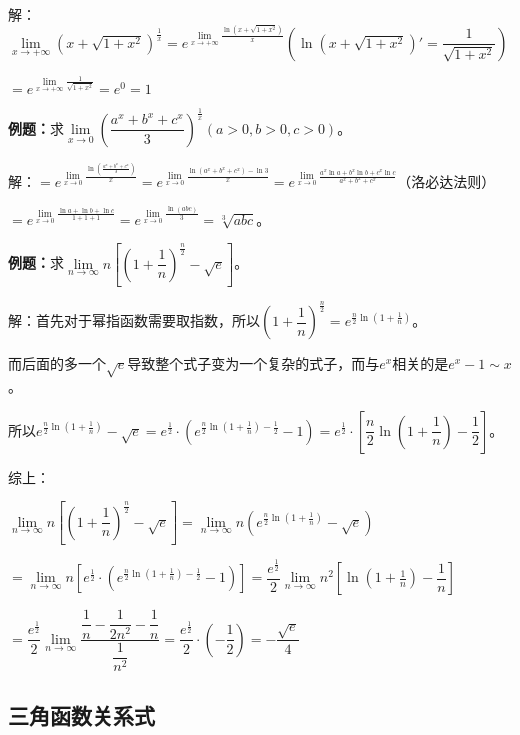 解：$\lim\limits_{x\to+\infty}(x+\sqrt{1+x^2})^{\frac{1}{x}}=e^{\lim\limits_{x\to+\infty}\frac{\ln(x+\sqrt{1+x^2})}{x}} \left(\ln(x+\sqrt{1+x^2})'=\dfrac{1}{\sqrt{1+x^2}}\right)$\medskip

$=e^{\lim\limits_{x\to+\infty}\frac{1}{\sqrt{1+x^2}}}=e^0=1$

\textbf{例题：}求$\lim\limits_{x\to 0}\left(\dfrac{a^x+b^x+c^x}{3}\right)^{\frac{1}{x}}(a>0,b>0,c>0)$。\medskip

解：$=e^{\lim\limits_{x\to 0}\frac{\ln\left(\frac{a^x+b^x+c^x}{3}\right)}{x}}=e^{\lim\limits_{x\to 0}\frac{\ln(a^x+b^x+c^x)-\ln 3}{x}}=e^{\lim\limits_{x\to 0}\frac{a^x\ln a+b^x\ln b+c^x\ln c}{a^x+b^x+c^x}}$（洛必达法则）

$=e^{\lim\limits_{x\to 0}\frac{\ln a+\ln b+\ln c}{1+1+1}}=e^{\lim\limits_{x\to 0}\frac{\ln(abc)}{3}}=\sqrt[3]{abc}$。\medskip

\textbf{例题：}求$\lim\limits_{n\to\infty}n\left[\left(1+\dfrac{1}{n}\right)^{\frac{n}{2}}-\sqrt{e}\right]$。

解：首先对于幂指函数需要取指数，所以$\left(1+\dfrac{1}{n}\right)^{\frac{n}{2}}=e^{\frac{n}{2}\ln(1+\frac{1}{n})}$。\medskip

而后面的多一个$\sqrt{e}$导致整个式子变为一个复杂的式子，而与$e^x$相关的是$e^x-1\sim x$。

所以$e^{\frac{n}{2}\ln(1+\frac{1}{n})}-\sqrt{e}=e^{\frac{1}{2}}\cdot\left(e^{\frac{n}{2}\ln(1+\frac{1}{n})-\frac{1}{2}}-1\right)=e^{\frac{1}{2}}\cdot\left[\dfrac{n}{2}\ln(1+\dfrac{1}{n})-\dfrac{1}{2}\right]$。

综上：

$\lim\limits_{n\to\infty}n\left[\left(1+\dfrac{1}{n}\right)^{\frac{n}{2}}-\sqrt{e}\right]=\lim\limits_{n\to\infty}n\left(e^{\frac{n}{2}\ln(1+\frac{1}{n})}-\sqrt{e}\right)$ \medskip

$=\lim\limits_{n\to\infty}n\left[e^{\frac{1}{2}}\cdot\left(e^{\frac{n}{2}\ln(1+\frac{1}{n})-\frac{1}{2}}-1\right)\right]=\dfrac{e^{\frac{1}{2}}}{2}\lim\limits_{n\to\infty}n^2\left[\ln\left(1+\frac{1}{n}\right)-\dfrac{1}{n}\right]$

$=\dfrac{e^{\frac{1}{2}}}{2}\lim\limits_{n\to\infty}\dfrac{\dfrac{1}{n}-\dfrac{1}{2n^2}-\dfrac{1}{n}}{\dfrac{1}{n^2}}=\dfrac{e^{\frac{1}{2}}}{2}\cdot\left(-\dfrac{1}{2}\right)=-\dfrac{\sqrt{e}}{4}$

\subsection{三角函数关系式}

